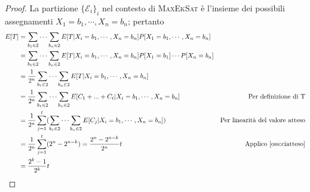 \begin{proof}
	La partizione $\{\mathcal{E}_i\}_i$ nel contesto di \textsc{MaxEkSat} è l'insieme
	dei possibili assegnamenti $X_1 = b_1, \cdots, X_n = b_n$; pertanto
	\begin{align*}
		E[T] & = \sum_{b_1 \in 2} \cdots \sum_{b_n\in 2} E[T|X_i = b_1, \cdots, X_n = b_n]P[X_1 = b_1, \cdots, X_n = b_n]   											\\
		     & = \sum_{b_1 \in 2} \cdots \sum_{b_n\in 2} E[T|X_i = b_1, \cdots, X_n = b_n]P[X_1 = b_1] \cdots P[X_n = b_n]  											\\
		     & = \frac{1}{2^n}\sum_{b_1 \in 2} \cdots \sum_{b_n\in 2} E[T|X_i = b_1, \cdots, X_n = b_n]                     											\\
			 & = \frac{1}{2^n}\sum_{b_1 \in 2} \cdots \sum_{b_n \in 2} E[C_1 + ... + C_t | X_i = b_1, \cdots, X_n = b_n] & \text{Per definizione di T}					\\
		     & = \frac{1}{2^n}\sum_{j = 1}^{t}(\sum_{b_1 \in 2} \cdots \sum_{b_n\in 2} E[C_j|X_i = b_1, \cdots, X_n = b_n]) & \text{Per linearità del valore atteso} 	\\
		     & = \frac{1}{2^n} \sum_{j = 1}^t (2^n - 2^{n -k}) = \frac{2^n - 2^{n-k}}{2^n}t & \text{Applico \cref{oss:ciatteso}} 										\\
			& = \frac{2^k - 1}{2^k}t
	\end{align*}
\end{proof}

